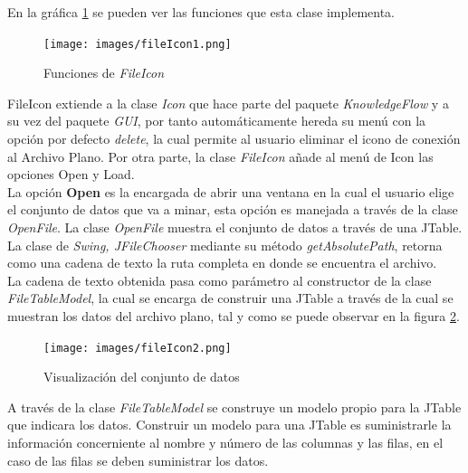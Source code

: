 En la gr\'afica \ref{fileIcon1} se pueden ver las funciones que esta clase implementa.\\

\begin{figure}[t]
\centering
\texttt{[image: images/fileIcon1.png]}
\caption{Funciones de \textit{FileIcon}}
\label{fileIcon1}
\end{figure}

FileIcon extiende a la clase \textit{Icon} que hace parte del paquete \textit{KnowledgeFlow} y a su vez del
paquete \textit{GUI}, por tanto autom\'aticamente hereda su men\'u con la opci\'on por defecto \textit{delete}, la
cual permite al usuario eliminar el icono de conexi\'on al Archivo Plano. Por otra parte, la clase
\textit{FileIcon} a\~nade al men\'u de Icon las opciones Open y Load.\\

La opci\'on \textbf{Open} es la encargada de abrir una ventana en la cual el usuario elige el conjunto de datos
que va a minar, esta opci\'on es manejada a trav\'es de la clase \textit{OpenFile}. La clase \textit{OpenFile}
muestra el conjunto de datos a trav\'es de una JTable.\\

La clase de \textit{Swing, JFileChooser} mediante su m\'etodo \textit{getAbsolutePath}, retorna como una cadena de
texto la ruta completa en donde se encuentra el archivo.\\ 

La cadena de texto obtenida pasa como par\'ametro al constructor de la clase \textit{FileTableModel}, la cual se
encarga de construir una JTable a trav\'es de la cual se muestran los datos del archivo plano, tal y como se puede
observar en la figura \ref{fileIcon2}.\\

\begin{figure}[t]
\centering
\texttt{[image: images/fileIcon2.png]}
\caption{Visualizaci\'on del conjunto de datos}
\label{fileIcon2}
\end{figure}

A trav\'es de la clase \textit{FileTableModel} se construye un modelo propio para la JTable que indicara los
datos. Construir un modelo para una JTable es suministrarle la informaci\'on concerniente al nombre y n\'umero de
las columnas y las filas, en el caso de las filas se deben suministrar los datos.\\

